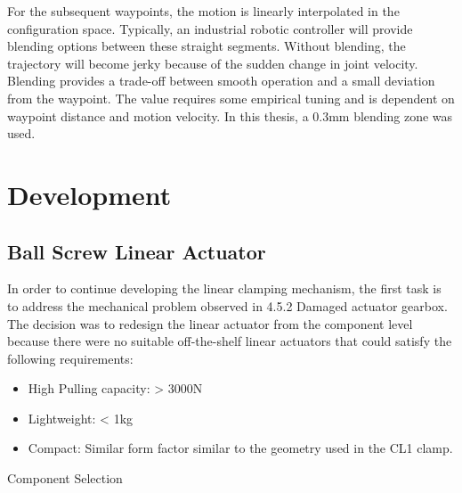 For the subsequent waypoints, the motion is linearly interpolated in the configuration space. Typically, an industrial robotic controller will provide blending options between these straight segments. Without blending, the trajectory will become 	jerky because of the sudden change in joint velocity. Blending provides a trade-off between smooth operation and a small deviation from the waypoint. The value requires some empirical tuning and is dependent on waypoint distance and motion velocity. In this thesis, a 0.3mm blending zone was used. 

\section{Development}

\subsection{Ball Screw Linear Actuator}

In order to continue developing the linear clamping mechanism, the first task is to address the mechanical problem observed in 4.5.2 Damaged actuator gearbox. The decision was to redesign the linear actuator from the component level because there were no suitable off-the-shelf linear actuators that could satisfy the following requirements:
\begin{itemize}
    \item High Pulling capacity: > 3000N
    \item Lightweight: < 1kg
    \item Compact: Similar form factor similar to the geometry used in the CL1 clamp.
\end{itemize}

Component Selection

